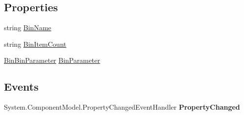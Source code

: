 \subsection*{Properties}
\begin{DoxyCompactItemize}
\item 
\hypertarget{class_amazon___price___finder_1_1amazon_1_1ecs_1_1_bin_a4a7956c7c653c30210b4851103a5b68f}{string \hyperlink{class_amazon___price___finder_1_1amazon_1_1ecs_1_1_bin_a4a7956c7c653c30210b4851103a5b68f}{Bin\-Name}}\label{class_amazon___price___finder_1_1amazon_1_1ecs_1_1_bin_a4a7956c7c653c30210b4851103a5b68f}

\begin{DoxyCompactList}\small\item\em \end{DoxyCompactList}\item 
\hypertarget{class_amazon___price___finder_1_1amazon_1_1ecs_1_1_bin_a63a104ac70bca07da0d6c396e9f6b346}{string \hyperlink{class_amazon___price___finder_1_1amazon_1_1ecs_1_1_bin_a63a104ac70bca07da0d6c396e9f6b346}{Bin\-Item\-Count}}\label{class_amazon___price___finder_1_1amazon_1_1ecs_1_1_bin_a63a104ac70bca07da0d6c396e9f6b346}

\begin{DoxyCompactList}\small\item\em \end{DoxyCompactList}\item 
\hypertarget{class_amazon___price___finder_1_1amazon_1_1ecs_1_1_bin_aeb3c0b32b17464ac30ea2aad940a098c}{\hyperlink{class_amazon___price___finder_1_1amazon_1_1ecs_1_1_bin_bin_parameter}{Bin\-Bin\-Parameter} \hyperlink{class_amazon___price___finder_1_1amazon_1_1ecs_1_1_bin_aeb3c0b32b17464ac30ea2aad940a098c}{Bin\-Parameter}}\label{class_amazon___price___finder_1_1amazon_1_1ecs_1_1_bin_aeb3c0b32b17464ac30ea2aad940a098c}

\begin{DoxyCompactList}\small\item\em \end{DoxyCompactList}\end{DoxyCompactItemize}
\subsection*{Events}
\begin{DoxyCompactItemize}
\item 
\hypertarget{class_amazon___price___finder_1_1amazon_1_1ecs_1_1_bin_a94689c7ea1a6a9d7c96669e147b5f8bf}{System.\-Component\-Model.\-Property\-Changed\-Event\-Handler {\bfseries Property\-Changed}}\label{class_amazon___price___finder_1_1amazon_1_1ecs_1_1_bin_a94689c7ea1a6a9d7c96669e147b5f8bf}

\end{DoxyCompactItemize}


